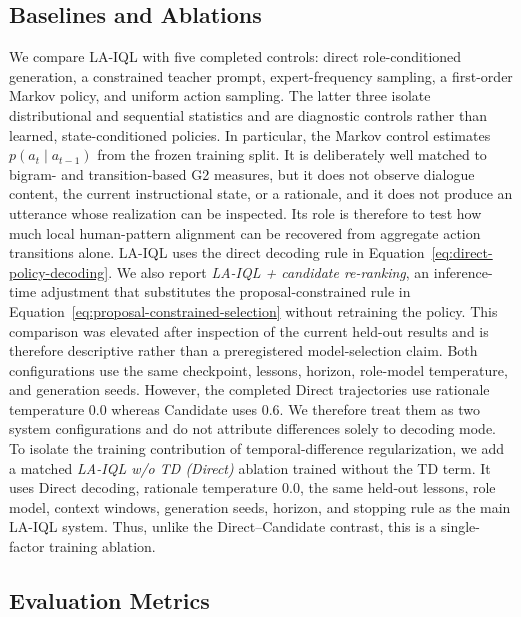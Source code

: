 \documentclass[manuscript,review,anonymous]{acmart}
\begin{document}
\subsection{Baselines and Ablations}

We compare LA-IQL with five completed controls: direct role-conditioned generation, a constrained teacher prompt, expert-frequency sampling, a first-order Markov policy, and uniform action sampling.
The latter three isolate distributional and sequential statistics and are
diagnostic controls rather than learned, state-conditioned policies. In
particular, the Markov control estimates
$p(a_t\mid a_{t-1})$ from the frozen training split. It is deliberately well
matched to bigram- and transition-based G2 measures, but it does not observe
dialogue content, the current instructional state, or a rationale, and it
does not produce an utterance whose realization can be inspected. Its role is
therefore to test how much local human-pattern alignment can be recovered from
aggregate action transitions alone.
LA-IQL uses the direct decoding rule in Equation~\ref{eq:direct-policy-decoding}. We also report \emph{LA-IQL + candidate re-ranking}, an inference-time adjustment that substitutes the proposal-constrained rule in Equation~\ref{eq:proposal-constrained-selection} without retraining the policy. This comparison was elevated after inspection of the current held-out results and is therefore descriptive rather than a preregistered model-selection claim. Both configurations use the same checkpoint, lessons, horizon, role-model temperature, and generation seeds. However, the completed Direct trajectories use rationale temperature 0.0 whereas Candidate uses 0.6. We therefore treat them as two system configurations and do not attribute differences solely to decoding mode.
To isolate the training contribution of temporal-difference regularization, we
add a matched \emph{LA-IQL w/o TD (Direct)} ablation trained without the TD
term. It uses Direct decoding, rationale temperature 0.0, the same held-out
lessons, role model, context windows, generation seeds, horizon, and stopping
rule as the main LA-IQL system. Thus, unlike the Direct--Candidate contrast,
this is a single-factor training ablation.

\subsection{Evaluation Metrics}
\end{document}
